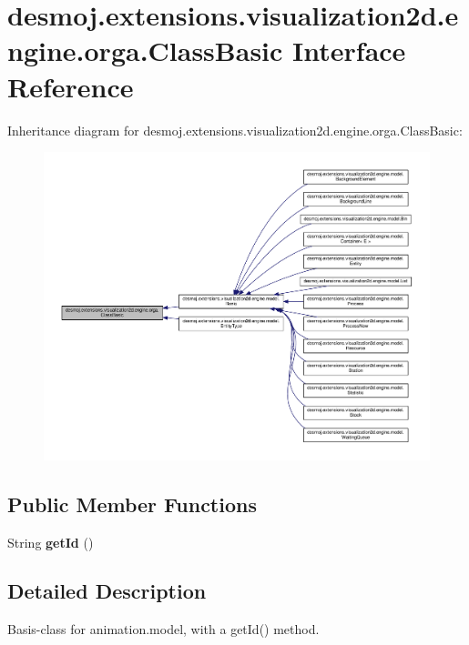 \section{desmoj.\-extensions.\-visualization2d.\-engine.\-orga.\-Class\-Basic Interface Reference}
\label{interfacedesmoj_1_1extensions_1_1visualization2d_1_1engine_1_1orga_1_1_class_basic}


Inheritance diagram for desmoj.\-extensions.\-visualization2d.\-engine.\-orga.\-Class\-Basic\-:
\nopagebreak
\begin{figure}[H]
\begin{center}
\leavevmode
\includegraphics[width=350pt]{interfacedesmoj_1_1extensions_1_1visualization2d_1_1engine_1_1orga_1_1_class_basic__inherit__graph}
\end{center}
\end{figure}
\subsection*{Public Member Functions}
\begin{DoxyCompactItemize}
\item 
String {\bfseries get\-Id} ()\label{interfacedesmoj_1_1extensions_1_1visualization2d_1_1engine_1_1orga_1_1_class_basic_aadcbf4c4928e39365556872c7dc9bbb2}

\end{DoxyCompactItemize}


\subsection{Detailed Description}
Basis-\/class for animation.\-model, with a get\-Id() method.

